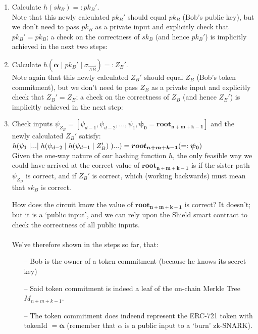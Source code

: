 \documentclass{article}
\DeclarePairedDelimiter\br{(}{)}
\begin{document}
\begin{enumerate}
  \item Calculate $h(sk_B) =: pk_B'$.\\
    Note that this newly calculated $pk_B'$ should equal $pk_B$ (Bob's public key), but we don't need to pass $pk_B$ as a private input and explicitly check that $pk_B'=pk_B$; a check on the correctness of $sk_B$ (and hence $pk_B'$) is implicitly achieved in the next two steps:
  \item Calculate $h(\bm{\alpha}\;|\;pk_B'\;|\;\sigma_{\vec{AB}}) =: Z_B'$.\\
    Note again that this newly calculated $Z_B'$ should equal $Z_B$ (Bob's token commitment), but we don't need to pass $Z_B$ as a private input and explicitly check that $Z_B'=Z_B$; a check on the correctness of $Z_B$ (and hence $Z_B'$) is implicitly achieved in the next step:
  \item Check inputs $\psi_{Z_B}=[\psi_{d-1}, \psi_{d-2},..., \psi_{1}, \bm{\psi_{0}=root_{n+m+k-1}}]$ and the newly calculated $Z_B'$ satisfy:\\
    $h\br*{\psi_{1}\;|...|\;h\br*{\psi_{d-2}\;|\;h\br*{\psi_{d-1}\;|\;Z_B'}\;}...} = \bm{root_{n+m+k-1}} ( =: \bm{\psi_{0}})$\\
    Given the one-way nature of our hashing function $h$, the only feasible way we could have arrived at the correct value of $\bm{root_{n+m+k-1}}$ is if the sister-path $\psi_{Z_B}$ is correct, and if $Z_B'$ is correct, which (working backwards) must mean that $sk_B$ is correct.

    How does the circuit know the value of $\bm{root_{n+m+k-1}}$ is correct? It doesn't; but it is a `public input', and we can rely upon the Shield smart contract to check the correctness of all public inputs.\\
  \\
  We've therefore shown in the steps so far, that:
  \begin{itemize}
    \item[--] Bob is the owner of a token commitment (because he knows its secret key)
    \item[--] Said token commitment is indeed a leaf of the on-chain Merkle Tree $M_{n+m+k-1}$.
    \item[--] The token commitment does indeend represent the ERC-721 token with tokenId $=\bm{\alpha}$ (remember that $\alpha$ is a public input to a `burn' zk-SNARK).
  \end{itemize}


\end{enumerate}
\end{document}
